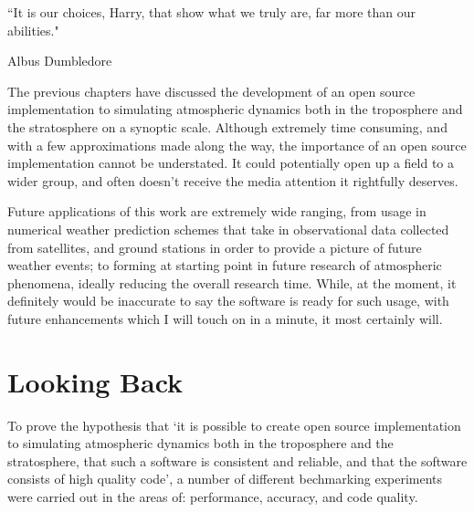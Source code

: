 \epigraph{``It is our choices, Harry, that show what we truly are, far more than our abilities."}{Albus Dumbledore}

The previous chapters have discussed the development of an open source implementation to simulating atmospheric dynamics both in the troposphere and the stratosphere on a synoptic scale. Although extremely time consuming, and with a few approximations made along the way, the importance of an open source implementation cannot be understated. It could potentially open up a field to a wider group, and often doesn't receive the media attention it rightfully deserves.

Future applications of this work are extremely wide ranging, from usage in numerical weather prediction schemes that take in observational data collected from satellites, and ground stations in order to provide a picture of future weather events; to forming at starting point in future research of atmospheric phenomena, ideally reducing the overall research time. While, at the moment, it definitely would be inaccurate to say the software is ready for such usage, with future enhancements which I will touch on in a minute, it most certainly will.

\section{Looking Back}
To prove the hypothesis that `it is possible to create open source implementation to simulating atmospheric dynamics both in the troposphere and the stratosphere, that such a software is consistent and reliable, and that the software consists of high quality code', a number of different bechmarking experiments were carried out in the areas of: performance, accuracy, and code quality.

